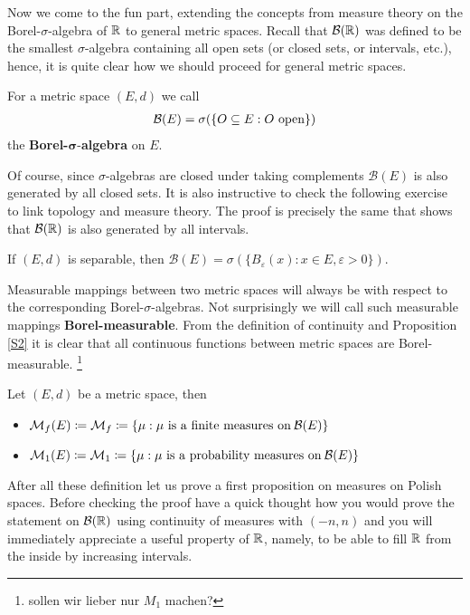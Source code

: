 Now we come to the fun part, extending the concepts from measure theory on the Borel-$\sigma$-algebra of $\mathbb{R}$ to general metric spaces. Recall that $\mathcal B(\mathbb{R})$ was defined to be the smallest $\sigma$-algebra containing all open sets (or closed sets, or intervals, etc.), hence, it is quite clear how we should proceed for general metric spaces.
\begin{ldef}
\begin{deff}
	For a metric space $(E,d)$ we call 
	\begin{align*}
		\mathcal{B}(E)=\sigma(\{O\subseteq E: O\text{ open}\})
	\end{align*}	
		 the \textbf{Borel-}$\mathbf{\sigma}$-\textbf{algebra} on $E$.
\end{deff}
\end{ldef}
Of course, since $\sigma$-algebras are closed under taking complements $\mathcal B(E)$ is also generated by all closed sets. It is also instructive to check the following exercise to link topology and measure theory. The proof is precisely the same that shows that $\mathcal B(\mathbb{R})$ is also generated by all intervals.
\begin{luebung}
	If $(E,d)$ is separable, then $\mathcal B(E)=\sigma(\{B_\varepsilon (x):x\in E, \varepsilon >0\}).$
\end{luebung}
Measurable mappings between two metric spaces will always be with respect to the corresponding Borel-$\sigma$-algebras. Not surprisingly we will call such measurable mappings \textbf{Borel-measurable}. From the definition of continuity and Proposition \ref{S2} it is clear that all continuous functions between metric spaces are Borel-measurable.
\footnote{sollen wir lieber nur $M_1$ machen?}
\begin{ldef}
\begin{deff}
	Let $(E,d)$ be a metric space, then
	\begin{itemize}
		\item
			$\mathcal{M}_f(E) \coloneqq \mathcal{M}_f \coloneqq \{ \mu: \mu \text{ is a finite measures on}\: \mathcal{B}(E) \}$
		\item
			$\mathcal{M}_1(E) \coloneqq \mathcal{M}_1 \coloneqq \{\mu:  \mu \text{ is a probability measures on}\: \mathcal{B}(E) \}$
	\end{itemize}
\end{deff}
\end{ldef}
After all these definition let us prove a first proposition on measures on Polish spaces. Before checking the proof have a quick thought how you would prove the statement on $\mathcal B(\mathbb{R})$ using continuity of measures with $(-n,n)$ and you will immediately appreciate a useful property of $\mathbb{R}$, namely, to be able to fill $\mathbb{R}$ from the inside by increasing intervals.
